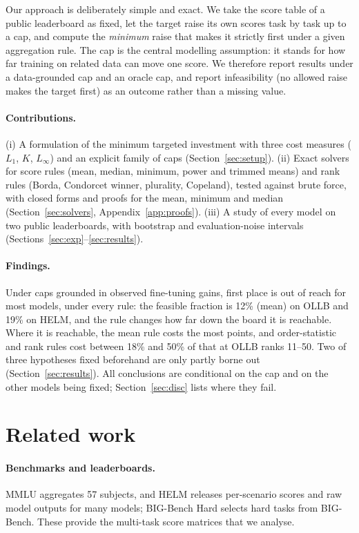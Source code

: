 \documentclass{article}
\begin{document}
Our approach is deliberately simple and exact. We take the score table of a public leaderboard as fixed, let the target raise its own scores task by task up to a cap, and compute the \emph{minimum} raise that makes it strictly first under a given aggregation rule. The cap is the central modelling assumption: it stands for how far training on related data can move one score. We therefore report results under a data-grounded cap and an oracle cap, and report infeasibility (no allowed raise makes the target first) as an outcome rather than a missing value.

\paragraph{Contributions.}
(i) A formulation of the minimum targeted investment with three cost measures ($L_1$, $K$, $L_\infty$) and an explicit family of caps (Section~\ref{sec:setup}). (ii) Exact solvers for score rules (mean, median, minimum, power and trimmed means) and rank rules (Borda, Condorcet winner, plurality, Copeland), tested against brute force, with closed forms and proofs for the mean, minimum and median (Section~\ref{sec:solvers}, Appendix~\ref{app:proofs}). (iii) A study of every model on two public leaderboards, with bootstrap and evaluation-noise intervals (Sections~\ref{sec:exp}--\ref{sec:results}).

\paragraph{Findings.}
Under caps grounded in observed fine-tuning gains, first place is out of reach for most models, under every rule: the feasible fraction is 12\% (mean) on OLLB and 19\% on HELM, and the rule changes how far down the board it is reachable. Where it is reachable, the mean rule costs the most points, and order-statistic and rank rules cost between 18\% and 50\% of that at OLLB ranks 11--50. Two of three hypotheses fixed beforehand are only partly borne out (Section~\ref{sec:results}). All conclusions are conditional on the cap and on the other models being fixed; Section~\ref{sec:disc} lists where they fail.

\section{Related work}
\label{sec:related}
\paragraph{Benchmarks and leaderboards.}
MMLU \citep{hendrycks2021mmlu} aggregates 57 subjects, and HELM \citep{liang2023helm} releases per-scenario scores and raw model outputs for many models; BIG-Bench Hard \citep{suzgun2023bbh} selects hard tasks from BIG-Bench. These provide the multi-task score matrices that we analyse.
\end{document}
